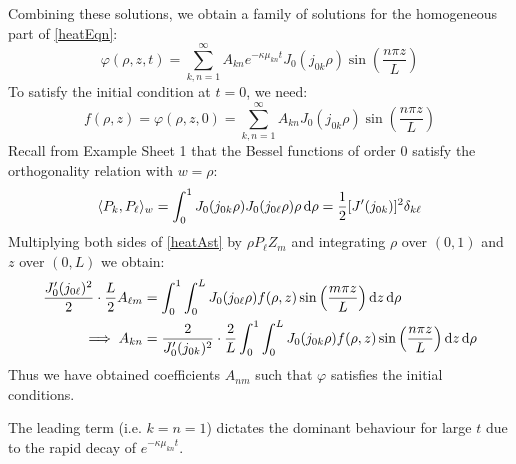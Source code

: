 \documentclass[../main.tex]{subfiles}
\begin{document}
Combining these solutions, we obtain a family of solutions for the homogeneous part of \cref{heatEqn}:
\[
  \varphi(\rho, z, t) = \sum_{k, n = 1}^{\infty} A_{k n} e^{-\kappa \mu_{k n} t} J_{0}(j_{0 k} \rho) \sin\left(\frac{n \pi z}{L}\right)
\]
To satisfy the initial condition at $t = 0$, we need:
\begin{equation}
  f(\rho, z) = \varphi(\rho, z, 0) = \sum_{k, n = 1}^{\infty} A_{k n} J_0(j_{0 k} \rho) \sin\left(\frac{n \pi z}{L}\right) \label{heatAst} \tag{$\ast$}
\end{equation}
Recall from Example Sheet 1 that the Bessel functions of order 0 satisfy the orthogonality relation with $w = \rho$:
\[
  \langle P_k, P_\ell \rangle_{w} = \int_{0}^{1} J_0(j_{0 k} \rho) J_{0}(j_{0 \ell} \rho) \rho \d{\rho} = \frac{1}{2} [J'(j_{0 k})]^2 \delta_{k \ell}
\]
Multiplying both sides of \cref{heatAst} by $\rho P_\ell Z_m$ and integrating $\rho$ over $(0, 1)$ and $z$ over $(0, L)$ we obtain:
\begin{align*}
  \frac{J'_0(j_{0 \ell})^2}{2} \cdot \frac{L}{2} A_{\ell m} &= \int_{0}^{1} \int_{0}^{L} J_0(j_{0 \ell} \rho) f(\rho, z) \sin\left(\frac{m \pi z}{L}\right) \d{z} \d{\rho} \\
  \implies A_{k n} &= \frac{2}{J_0'(j_{0 k})^2} \cdot \frac{2}{L} \int_{0}^{1} \int_{0}^{L} J_0(j_{0 k} \rho) f(\rho, z) \sin\left(\frac{n \pi z}{L}\right) \d{z} \d{\rho}
\end{align*}
Thus we have obtained coefficients $A_{nm}$ such that $\varphi$ satisfies the initial conditions.
\begin{remark}
  The leading term (i.e. $k = n = 1$) dictates the dominant behaviour for large $t$ due to the rapid decay of $e^{-\kappa \mu_{k n}t}$.
\end{remark}
\end{document}
